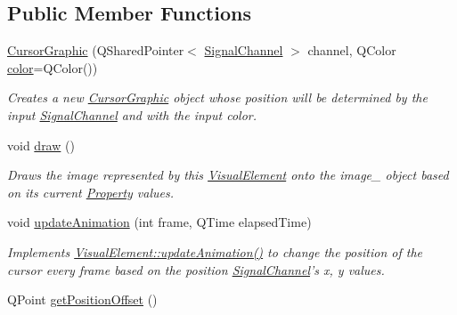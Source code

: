 \subsection*{Public Member Functions}
\begin{DoxyCompactItemize}
\item 
\hyperlink{class_picto_1_1_cursor_graphic_ae5fcecf5fb9a0818e71cd87131f205ab}{Cursor\-Graphic} (Q\-Shared\-Pointer$<$ \hyperlink{class_picto_1_1_signal_channel}{Signal\-Channel} $>$ channel, Q\-Color \hyperlink{struct_picto_1_1_visual_element_a45c3042c969717eb2ab60373369c7de7}{color}=Q\-Color())
\begin{DoxyCompactList}\small\item\em Creates a new \hyperlink{class_picto_1_1_cursor_graphic}{Cursor\-Graphic} object whose position will be determined by the input \hyperlink{class_picto_1_1_signal_channel}{Signal\-Channel} and with the input color. \end{DoxyCompactList}\item 
\hypertarget{class_picto_1_1_cursor_graphic_ac7591847b95596bc30d7e5e18e4e453a}{void \hyperlink{class_picto_1_1_cursor_graphic_ac7591847b95596bc30d7e5e18e4e453a}{draw} ()}\label{class_picto_1_1_cursor_graphic_ac7591847b95596bc30d7e5e18e4e453a}

\begin{DoxyCompactList}\small\item\em Draws the image represented by this \hyperlink{struct_picto_1_1_visual_element}{Visual\-Element} onto the image\-\_\- object based on its current \hyperlink{class_picto_1_1_property}{Property} values. \end{DoxyCompactList}\item 
\hypertarget{class_picto_1_1_cursor_graphic_a57de42c02ab434f5594b04c214753327}{void \hyperlink{class_picto_1_1_cursor_graphic_a57de42c02ab434f5594b04c214753327}{update\-Animation} (int frame, Q\-Time elapsed\-Time)}\label{class_picto_1_1_cursor_graphic_a57de42c02ab434f5594b04c214753327}

\begin{DoxyCompactList}\small\item\em Implements \hyperlink{struct_picto_1_1_visual_element_a598c8f6e33c58b85b80197e3743b0e91}{Visual\-Element\-::update\-Animation()} to change the position of the cursor every frame based on the position \hyperlink{class_picto_1_1_signal_channel}{Signal\-Channel}'s x, y values. \end{DoxyCompactList}\item 
\hypertarget{class_picto_1_1_cursor_graphic_afd45b81d61ebfe3c57fc14b037d0145e}{Q\-Point \hyperlink{class_picto_1_1_cursor_graphic_afd45b81d61ebfe3c57fc14b037d0145e}{get\-Position\-Offset} ()}\label{class_picto_1_1_cursor_graphic_afd45b81d61ebfe3c57fc14b037d0145e}


\end{DoxyCompactItemize}
